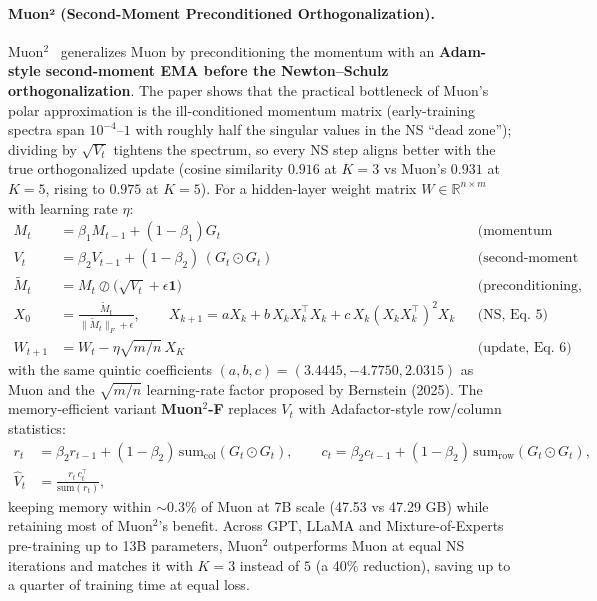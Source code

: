 \paragraph{Muon² (Second-Moment Preconditioned Orthogonalization).}
Muon$^2$~\citep{liu_muon2_2026} generalizes Muon by preconditioning the momentum with an
\textbf{Adam-style second-moment EMA before the Newton--Schulz orthogonalization}. The
paper shows that the practical bottleneck of Muon's polar approximation is the
ill-conditioned momentum matrix (early-training spectra span $10^{-4}$--$1$ with roughly
half the singular values in the NS ``dead zone''); dividing by $\sqrt{V_t}$ tightens the
spectrum, so every NS step aligns better with the true orthogonalized update (cosine
similarity $0.916$ at $K{=}3$ vs Muon's $0.931$ at $K{=}5$, rising to $0.975$ at
$K{=}5$). For a hidden-layer weight matrix $W \in \mathbb{R}^{n \times m}$ with learning
rate $\eta$:
\begin{align}
M_t &= \beta_1 M_{t-1} + (1-\beta_1) G_t && \text{(momentum EMA, Eq.~2)} \\
V_t &= \beta_2 V_{t-1} + (1-\beta_2)\, (G_t \odot G_t) && \text{(second-moment EMA, Eq.~3)} \\
\widetilde{M}_t &= M_t \oslash \big(\sqrt{V_t} + \epsilon \mathbf{1}\big) && \text{(preconditioning, Eq.~4)} \\
X_0 &= \frac{\widetilde{M}_t}{\|\widetilde{M}_t\|_F + \epsilon}, \qquad
X_{k+1} = aX_k + b\, X_k X_k^\top X_k + c\, X_k (X_k X_k^\top)^2 X_k && \text{(NS, Eq.~5)} \\
W_{t+1} &= W_t - \eta \sqrt{m/n}\, X_K && \text{(update, Eq.~6)}
\end{align}
with the same quintic coefficients $(a,b,c)=(3.4445,-4.7750,2.0315)$ as Muon and the
$\sqrt{m/n}$ learning-rate factor proposed by Bernstein (2025). The memory-efficient
variant \textbf{Muon$^2$-F} replaces $V_t$ with Adafactor-style row/column statistics:
\begin{align}
r_t &= \beta_2 r_{t-1} + (1-\beta_2)\,\mathrm{sum}_{\mathrm{col}}(G_t \odot G_t), \qquad
c_t = \beta_2 c_{t-1} + (1-\beta_2)\,\mathrm{sum}_{\mathrm{row}}(G_t \odot G_t), \\
\widehat{V}_t &= \frac{r_t\, c_t^\top}{\mathrm{sum}(r_t)},
\end{align}
keeping memory within $\sim$0.3\% of Muon at 7B scale (47.53 vs 47.29 GB) while retaining
most of Muon$^2$'s benefit. Across GPT, LLaMA and Mixture-of-Experts pre-training up to
13B parameters, Muon$^2$ outperforms Muon at equal NS iterations and matches it with
$K{=}3$ instead of $5$ (a 40\% reduction), saving up to a quarter of training time at
equal loss.


